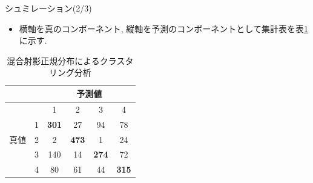 \documentclass[dvipdfmx]{beamer} %
\begin{document}
\begin{frame}{シュミレーション(2/3)}

\begin{itemize}
	\item 
	横軸を真のコンポーネント, 縦軸を予測のコンポーネントとして集計表を表\ref{cross2}に示す.
\end{itemize}

\begin{table}[tbp]
\begin{center}
\caption{混合射影正規分布によるクラスタリング分析}
\label{cross2}
\begin{tabular}{c|c|c c c c}
\hline
 &  & \multicolumn{4}{c}{予測値} \\ \hline
 &  & 1 & 2 & 3 & 4  \\ \hline 
 & 1 &  \textbf{301} & 27  & 94 & 78 \\ 
真値
 & 2 & 2 & \textbf{473} & 1 & 24 \\
 & 3 & 140 & 14 & \textbf{274} &72 \\ 
 & 4 & 80 & 61 & 44 & \textbf{315} \\ 
\hline
\end{tabular}
\end{center}
\end{table}
\end{frame}
\end{document}
